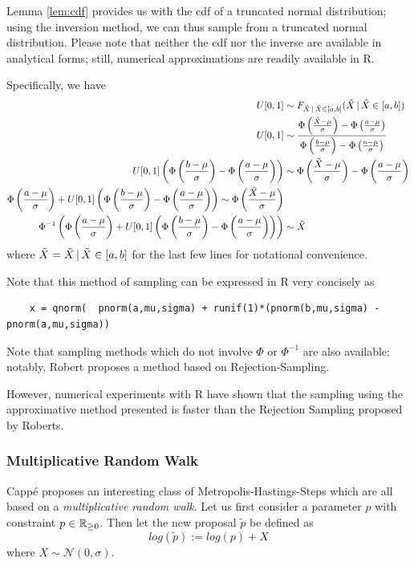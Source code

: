 Lemma \ref{lem:cdf} provides us with the cdf of a truncated normal distribution; using the inversion method, we can thus sample from a truncated normal distribution. Please note that neither the cdf nor the inverse are available in analytical forms; still, numerical approximations are readily available in R.

Specifically, we have
\begin{align*}
		U[0, 1] &\sim 	F_{ \tilde{X} \, | \, \tilde{X} \in [a, b]}( \tilde{X} \, | \, \tilde{X} \in [a, b]) \\
		U[0, 1] &\sim \frac{\Phi\left(\frac{\tilde{X} - \mu}{\sigma}\right) - \Phi\left(\frac{a - \mu}{\sigma}\right)}{\Phi\left(\frac{b - \mu}{\sigma}\right) - \Phi\left(\frac{a - \mu}{\sigma}\right)} \\
		U[0, 1] \left(\Phi\left(\frac{b - \mu}{\sigma}\right) - \Phi\left(\frac{a - \mu}{\sigma}\right)\right) &\sim \Phi\left(\frac{\tilde{X} - \mu}{\sigma}\right) - \Phi\left(\frac{a - \mu}{\sigma}\right) \\
		\Phi\left(\frac{a - \mu}{\sigma}\right) + U[0, 1] \left(\Phi\left(\frac{b - \mu}{\sigma}\right) - \Phi\left(\frac{a - \mu}{\sigma}\right)\right) \sim \Phi\left(\frac{\tilde{X} - \mu}{\sigma}\right) \\
		\Phi^{-1} \left(
			\Phi\left(\frac{a - \mu}{\sigma}\right) + U[0, 1] \left(\Phi\left(\frac{b - \mu}{\sigma}\right) - \Phi\left(\frac{a - \mu}{\sigma}\right)\right)
		\right)
		&\sim \tilde{X}
\end{align*}
where $\tilde{X} = \tilde{X} \, | \, \tilde{X} \in [a, b]$ for the last few lines for notational convenience. 

Note that this method of sampling can be expressed in R very concisely as 
\begin{verbatim}
	x = qnorm(  pnorm(a,mu,sigma) + runif(1)*(pnorm(b,mu,sigma) - pnorm(a,mu,sigma))  
\end{verbatim}

Note that sampling methods which do not involve $\Phi$ or $\Phi^{-1}$ are also available: notably, Robert\cite{Robert95simulationof} proposes a method based on Rejection-Sampling.
\vspace{0.5cm}


However, numerical experiments with R have shown that the sampling using the approximative method presented is faster than the Rejection Sampling proposed by Roberts. 
 


\subsubsection{Multiplicative Random Walk}
Cappé \cite{cappe} proposes an interesting class of Metropolis-Hastings-Steps which are all based on a \textit{multiplicative random walk}. Let us first consider a parameter $p$ with constraint $p \in \mathbb{R}_{\geq 0}$. Then let the new proposal $\tilde{p}$ be defined as 
\[
	log\left(\tilde{p}\right) := log(p) + X
\]
where $X \sim \mathcal{N}(0, \sigma)$.


